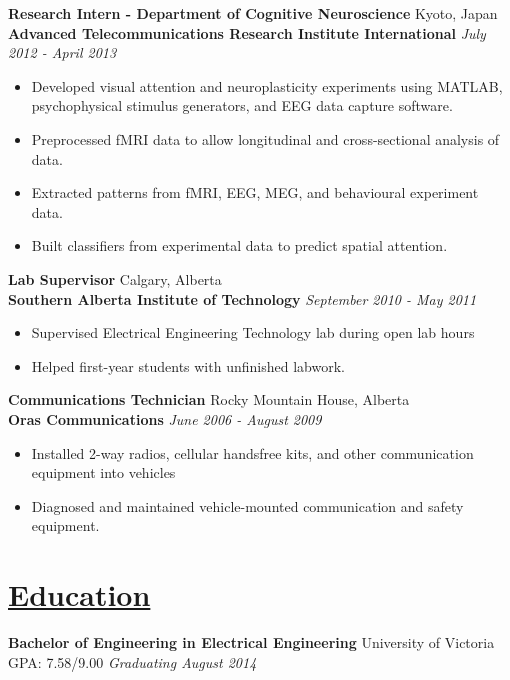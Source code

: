 \documentclass[a4paper, 11pt]{article}
\begin{document}
  \textbf{Research Intern - Department of Cognitive Neuroscience}
  \hfill
  Kyoto, Japan\\
  \textbf{Advanced Telecommunications Research Institute International}
  \hfill
  \emph{July 2012 - April 2013}
  \begin{itemize}[nosep]
    \item Developed visual attention and neuroplasticity experiments using MATLAB, psychophysical stimulus generators, and EEG data capture software.
    \item Preprocessed fMRI data to allow longitudinal and cross-sectional analysis of data.
    \item Extracted patterns from fMRI, EEG, MEG, and behavioural experiment data.
    \item Built classifiers from experimental data to predict spatial attention.
  \end{itemize}
  \medskip

  \textbf{Lab Supervisor}
  \hfill
  Calgary, Alberta\\
  \textbf{Southern Alberta Institute of Technology}
  \hfill
  \emph{September 2010 - May 2011}
  \begin{itemize}[nosep]
    \item Supervised Electrical Engineering Technology lab during open lab hours
    \item Helped first-year students with unfinished labwork.
  \end{itemize}
  \medskip

  \textbf{Communications Technician}
  \hfill
  Rocky Mountain House, Alberta \\
  \textbf{Oras Communications}
  \hfill
  \emph{June 2006 - August 2009}
  \begin{itemize}[nosep]
  \item Installed 2-way radios, cellular handsfree kits, and other communication equipment into vehicles
  \item Diagnosed and maintained vehicle-mounted communication and safety equipment.
  \end{itemize}  

\section{\underline{Education}}
  \textbf{Bachelor of Engineering in Electrical Engineering}
  \hfill
  University of Victoria\\
  GPA: 7.58/9.00
  \hfill
  \emph{Graduating August 2014}
  \medskip
  
\end{document}
